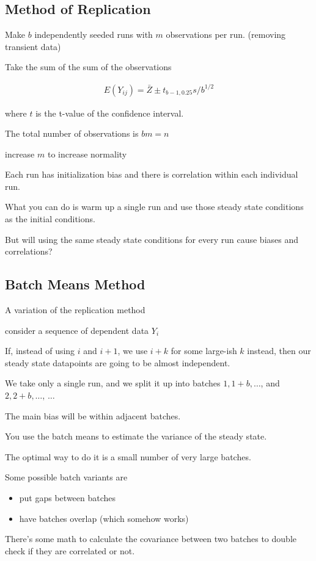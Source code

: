 \documentclass[fleqn]{report}
\newcommand{\equations} [1] {
\begin{gather*}
#1
\end{gather*}
}
\begin{document}
\subsection{ Method of Replication }

Make $b$ independently seeded runs with $m$ observations per run. 
(removing transient data)

Take the sum of the sum of the observations 

\equations{
    E(Y_{ij})
    =
    \bar Z \pm t_{b-1, 0.25} s/ b^{1/2}
}
where $t$ is the t-value of the confidence interval. 

The total number of observations is $bm = n$ 

increase $m$ to increase normality 

Each run has initialization bias and 
there is correlation within each individual run. 

What you can do is warm up a single run and use those steady state conditions 
as the initial conditions. 

But will using the same steady state conditions for every run cause biases 
and correlations?

\subsection{Batch Means Method }
A variation of the replication method 

consider a sequence of dependent data $Y_i$

If, instead of using $i$ and $i+1$, we use $i+k$ for some large-ish $k$ instead, 
then our steady state datapoints are going to be almost independent. 

We take only a single run, and we split it up into batches 
$1, 1+b, \ldots$, and $2, 2+b, \ldots$, $\ldots$

The main bias will be within adjacent batches. 

You use the batch means to estimate the variance of the steady state. 

The optimal way to do it is a small number of very large batches. 

Some possible batch variants are 
\begin{itemize}
    \item 
    put gaps between batches 
    \item 
    have batches overlap (which somehow works)
\end{itemize}

There's some math to calculate the covariance between two batches to double 
check if they are correlated or not. 
\end{document}
